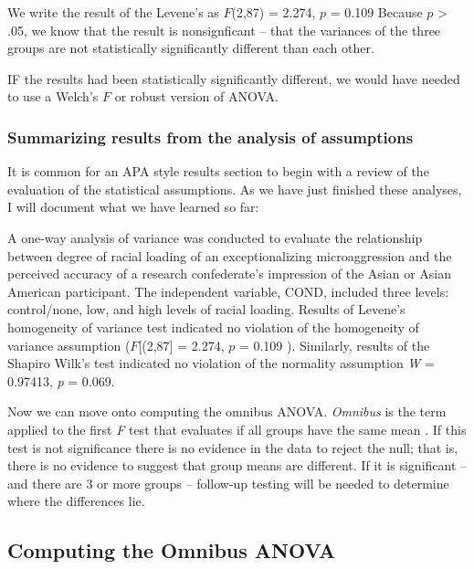 \documentclass[
  english,
]{book}
\begin{document}
We write the result of the Levene's as \(F\)(2,87) = 2.274, \(p\) = 0.109 Because \(p\) \textgreater{} .05, we know that the result is nonsignficant -- that the variances of the three groups are not statistically significantly different than each other.

IF the results had been statistically significantly different, we would have needed to use a Welch's \(F\) or robust version of ANOVA.

\hypertarget{summarizing-results-from-the-analysis-of-assumptions}{%
\subsubsection{Summarizing results from the analysis of assumptions}\label{summarizing-results-from-the-analysis-of-assumptions}}

It is common for an APA style results section to begin with a review of the evaluation of the statistical assumptions. As we have just finished these analyses, I will document what we have learned so far:

A one-way analysis of variance was conducted to evaluate the relationship between degree of racial loading of an exceptionalizing microaggression and the perceived accuracy of a research confederate's impression of the Asian or Asian American participant. The independent variable, COND, included three levels: control/none, low, and high levels of racial loading. Results of Levene's homogeneity of variance test indicated no violation of the homogeneity of variance assumption (\(F\){[}(2,87{]} = 2.274, \(p\) = 0.109 ). Similarly, results of the Shapiro Wilk's test indicated no violation of the normality assumption \emph{W} = 0.97413, \emph{p} = 0.069.

Now we can move onto computing the omnibus ANOVA. \emph{Omnibus} is the term applied to the first \emph{F} test that evaluates if all groups have the same mean \citep{chen_relationship_2018}. If this test is not significance there is no evidence in the data to reject the null; that is, there is no evidence to suggest that group means are different. If it is significant -- and there are 3 or more groups -- follow-up testing will be needed to determine where the differences lie.

\hypertarget{computing-the-omnibus-anova}{%
\subsection{Computing the Omnibus ANOVA}\label{computing-the-omnibus-anova}}
\end{document}
